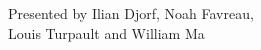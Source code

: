 \documentclass[preview]{standalone}
\begin{document}
\begin{center}
Presented by Ilian Djorf, Noah Favreau,\\ Louis Turpault and William Ma
\end{center}
\end{document}
